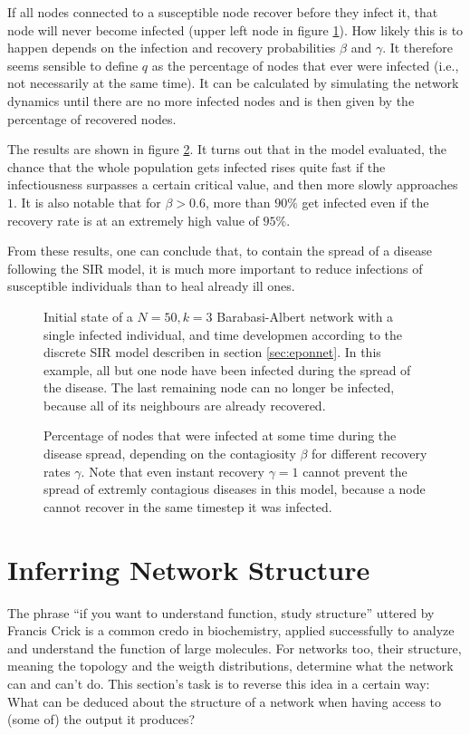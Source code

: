 \documentclass{scrartcl}
\begin{document}
If all nodes connected to a susceptible node recover before they infect it, that node will never become infected (upper left node in figure \ref{fig:D11}). How likely this is to happen depends on the infection and recovery probabilities $\beta$ and $\gamma$. 
It therefore seems sensible to define $q$ as the percentage of nodes that ever were infected (i.e., not necessarily at the same time). 
It can be calculated by simulating the network dynamics until there are no more infected nodes and is then given by the percentage of recovered nodes. 

The results are shown in figure \ref{fig:D12}. 
It turns out that in the model evaluated, the chance that the whole 
population gets infected rises quite fast if the infectiousness surpasses
a certain critical value, and then more slowly approaches $1$. It is also 
notable that for $\beta > 0.6$, more than $90\%$ get infected even if
the recovery rate is at an extremely high value of $95\%$.

From these results, one can conclude that, to contain the spread of a disease following the SIR model, 
 it is much more important to reduce infections of susceptible individuals than to heal already ill ones.


\begin{figure}
    \centering
    \def\svgwidth{0.9\textwidth}
    
    \caption{Initial state of a $N=50, k=3$ Barabasi-Albert network with a single infected individual, and time developmen according to the discrete SIR model describen in section \ref{sec:eponnet}. In this example, all but one node have been infected during the spread of the disease. The last remaining node can no longer be infected, because all of its neighbours are already recovered.}
    \label{fig:D11}
\end{figure}

\begin{figure}
    \centering
    \caption{Percentage of nodes that were infected at some time during the disease spread, 
		depending on the contagiosity $\beta$ for different recovery rates $\gamma$. Note that 
		even instant recovery $\gamma=1$ cannot prevent the spread of extremly contagious diseases
		in this model, because a node cannot recover in the same timestep it was infected.}
    \label{fig:D12}
\end{figure}


\clearpage
\section{Inferring Network Structure}
The phrase \enquote{if you want to understand function, study structure}
uttered by Francis Crick is a common credo in biochemistry, applied
successfully to analyze and understand the function of large molecules. For
networks too, their structure, meaning the topology and the weigth
distributions, determine what the network can and can't do. This section's
task is to reverse this idea in a certain way: What can be deduced about
the structure of a network when having access to (some of) the output it
produces?
\end{document}

